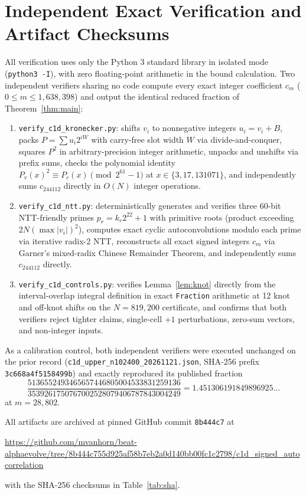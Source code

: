 \documentclass[11pt]{article}
\begin{document}
\section{Independent Exact Verification and Artifact Checksums}

All verification uses only the Python 3 standard library in isolated mode (\texttt{python3 -I}), with zero floating-point arithmetic in the bound calculation. Two independent verifiers sharing no code compute every exact integer coefficient $c_m$ ($0 \le m \le 1{,}638{,}398$) and output the identical reduced fraction of Theorem~\ref{thm:main}:

\begin{enumerate}
  \item \texttt{verify\_c1d\_kronecker.py}: shifts $v_i$ to nonnegative integers $u_i = v_i + B$, packs $P = \sum u_i 2^{iW}$ with carry-free slot width $W$ via divide-and-conquer, squares $P^2$ in arbitrary-precision integer arithmetic, unpacks and unshifts via prefix sums, checks the polynomial identity $P_v(x)^2 \equiv P_c(x) \pmod{2^{61}-1}$ at $x \in \{3, 17, 131071\}$, and independently sums $c_{244112}$ directly in $O(N)$ integer operations.
  \item \texttt{verify\_c1d\_ntt.py}: deterministically generates and verifies three 60-bit NTT-friendly primes $p_r = k_r 2^{22} + 1$ with primitive roots (product exceeding $2N (\max |v_i|)^2$), computes exact cyclic autoconvolutions modulo each prime via iterative radix-2 NTT, reconstructs all exact signed integers $c_m$ via Garner's mixed-radix Chinese Remainder Theorem, and independently sums $c_{244112}$ directly.
  \item \texttt{verify\_c1d\_controls.py}: verifies Lemma~\ref{lem:knot} directly from the interval-overlap integral definition in exact \texttt{Fraction} arithmetic at 12 knot and off-knot shifts on the $N = 819{,}200$ certificate, and confirms that both verifiers reject tighter claims, single-cell $+1$ perturbations, zero-sum vectors, and non-integer inputs.
\end{enumerate}

As a calibration control, both independent verifiers were executed unchanged on the prior record \cite{Can2026b} (\texttt{c1d\_upper\_n102400\_20261121.json}, SHA-256 prefix \texttt{3c668a4f5158499b}) and exactly reproduced its published fraction
\[
  \frac{5136552493465657446805004533831259136}{3539261750767002528079406787843004249} = 1.451306191849896925\ldots
\]
at $m = 28{,}802$.

All artifacts are archived at pinned GitHub commit \texttt{8b444c7} at
\begin{center}
\small\url{https://github.com/mvanhorn/beat-alphaevolve/tree/8b444c755d925af58b7eb2a0d140bb00fc1c2798/c1d_signed_autocorrelation}
\end{center}
with the SHA-256 checksums in Table~\ref{tab:sha}.
\end{document}
